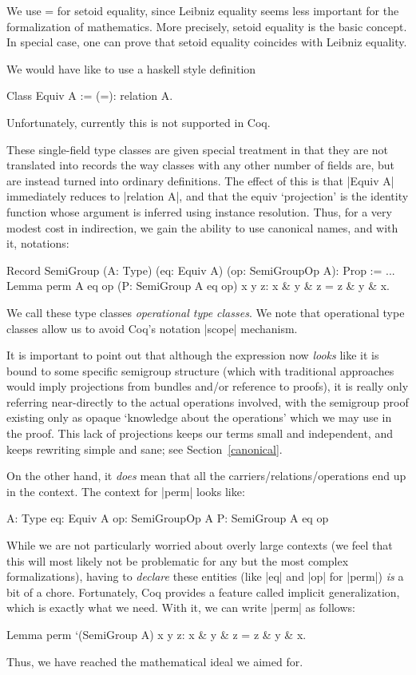 \documentclass[a4paper,10pt,runningheads]{llncs}
\begin{document}
We use = for setoid equality, since Leibniz equality seems less important for the formalization of
mathematics. More precisely, setoid equality is the basic concept. In special case, one can prove
that setoid equality coincides with Leibniz equality.

We would have like to use a haskell style definition
\begin{code}
Class Equiv A := (=): relation A.
\end{code}
Unfortunately, currently this is not supported in Coq.

These single-field type classes are given special treatment in that they are not translated into
records the way classes with any other number of fields are, but are instead turned into ordinary
definitions. The effect of this is that |Equiv A| immediately reduces to |relation A|, and that the
equiv `projection' is the identity function whose argument is inferred using instance resolution.
Thus, for a very modest cost in indirection, we gain the ability to use canonical names, and with
it, notations:
\begin{code}
Record SemiGroup (A: Type) (eq: Equiv A)
                 (op: SemiGroupOp A): Prop := ...
Lemma perm A eq op (P: SemiGroup A eq op) x y z:
                 x & y & z = z & y & x.
\end{code}
We call these type classes \emph{operational type classes}. We note that operational type classes
allow us to avoid Coq's notation |scope| mechanism.

It is important to point out that although the expression now \emph{looks} like it is bound to some
specific semigroup structure (which with traditional approaches would imply projections from bundles
and/or reference to proofs), it is really only referring near-directly to the actual operations
involved, with the semigroup proof existing only as opaque `knowledge about the operations' which we
may use in the proof. This lack of projections keeps our terms small and independent, and keeps
rewriting simple and sane; see Section~\ref{canonical}.

On the other hand, it \emph{does} mean that all the carriers/relations/operations end up in the
context. The context for |perm| looks like:
\begin{code}
  A: Type
  eq: Equiv A
  op: SemiGroupOp A
  P: SemiGroup A eq op
\end{code}

While we are not particularly worried about overly large contexts (we feel that this will most
likely not be problematic for any but the most complex formalizations), having to \emph{declare}
these entities (like |eq| and |op| for |perm|) \emph{is} a bit of a chore. Fortunately, Coq
provides a feature called implicit generalization, which is exactly what we need.
With it, we can write |perm| as follows:
\begin{code}
  Lemma perm `(SemiGroup A) x y z: x & y & z = z & y & x.
\end{code}
Thus, we have reached the mathematical ideal we aimed for.
\end{document}
